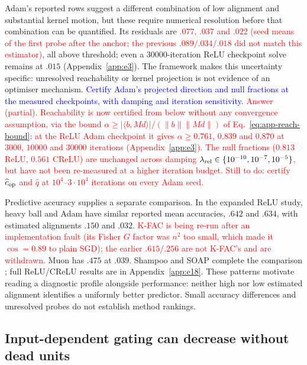 \documentclass{article}
\newcommand{\zied}[1]{\textcolor{blue}{#1}}
\newcommand{\nat}[1]{\textcolor{red}{#1}}
\theoremstyle{definition}
\theoremstyle{remark}
\begin{document}
Adam's reported rows suggest a different combination of low alignment and substantial kernel motion, but these require numerical resolution before that combination can be quantified. Its residuals are \nat{$.077$, $.037$ and $.022$ (seed means of the first probe after the anchor; the previous $.089/.034/.018$ did not match this estimator)}, all above threshold; even a $30000$-iteration ReLU checkpoint solve remains at $.015$ (Appendix~\ref{app:e3}). The framework makes this uncertainty specific: unresolved reachability or kernel projection is not evidence of an optimiser mechanism. \zied{Certify Adam's projected direction and null fractions at the measured checkpoints, with damping and iteration sensitivity.}
\nat{Answer (partial). Reachability is now certified from below without any convergence assumption, via the bound $\alpha\ge|\langle b,Md\rangle|/(\|b\|\|Md\|)$ of Eq.~\eqref{eq:app-reach-bound}: at the ReLU Adam checkpoint it gives $\alpha\ge0.761$, $0.839$ and $0.870$ at $3000$, $10000$ and $30000$ iterations (Appendix~\ref{app:e3}). The null fractions ($0.813$ ReLU, $0.561$ CReLU) are unchanged across damping $\lambda_{\rm rel}\in\{10^{-10},10^{-7},10^{-5}\}$, but have not been re-measured at a higher iteration budget. Still to do: certify $\widehat c_{\rm op}$ and $\widehat q$ at $10^4$--$3\cdot10^4$ iterations on every Adam seed.}

Predictive accuracy supplies a separate comparison. In the expanded ReLU study, heavy ball \citep{polyak1964methods} and Adam \citep{kingma2015adam} have similar reported mean accuracies, $.642$ and $.634$, with estimated alignments $.150$ and $.032$. \nat{K-FAC \citep{martens2015kfac} is being re-run after an implementation fault (its Fisher $G$ factor was $n^2$ too small, which made it $\cos=0.89$ to plain SGD); the earlier $.615$/$.256$ are not K-FAC's and are withdrawn.} Muon \citep{jordan2024muon} has $.475$ at $.039$. Shampoo and SOAP complete the comparison \citep{gupta2018shampoo,vyas2025soap}; full ReLU/CReLU results are in Appendix~\ref{app:e18}. These patterns motivate reading a diagnostic profile alongside performance: neither high nor low estimated alignment identifies a uniformly better predictor. Small accuracy differences and unresolved probes do not establish method rankings.

\subsection{Input-dependent gating can decrease without dead units}
\end{document}
